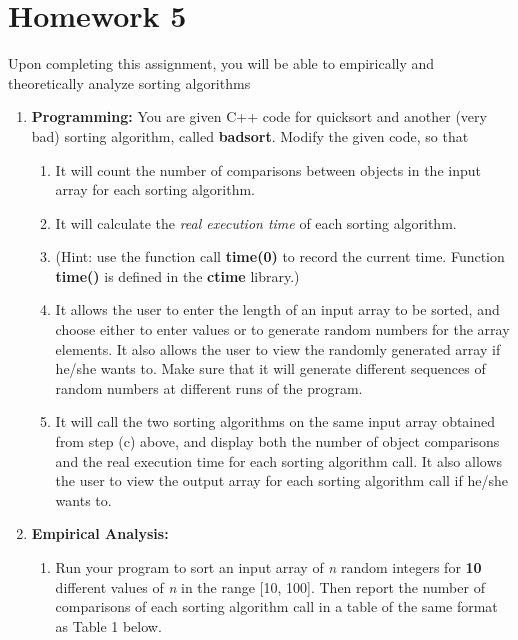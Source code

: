 \section{Homework 5}


Upon completing this assignment, you will be able to empirically and theoretically analyze sorting algorithms

\begin{enumerate}
\item \textbf{Programming:} You are given C++ code for quicksort and another (very bad) sorting algorithm, called \textbf{badsort}. Modify the given code, so that
  \begin{enumerate}
  \item It will count the number of comparisons between objects in the input array for each sorting algorithm.
  \item It will calculate the \emph{real execution time} of each sorting algorithm.
  \item [] (Hint: use the function call \textbf{time(0)} to record the current time. Function \textbf{time()} is defined in the \textbf{ctime} library.)
  \item It allows the user to enter the length of an input array to be sorted, and choose either to enter values or to generate random numbers for the array elements. It also allows the user to view the randomly generated array if he/she wants to. Make sure that it will generate different sequences of random numbers at different runs of the program.
  \item It will call the two sorting algorithms on the same input array obtained from step (c) above, and display both the number of object comparisons and the real execution time for each sorting algorithm call. It also allows the user to view the output array for each sorting algorithm call if he/she wants to.
  \end{enumerate}
\item \textbf{Empirical Analysis:}
  \begin{enumerate}
  \item Run your program to sort an input array of \emph{n} random integers for \textbf{10} different values of \emph{n} in the range [10, 100]. Then report the number of comparisons of each sorting algorithm call in a table of the same format as Table 1 below.

\end{enumerate}
\end{enumerate}

